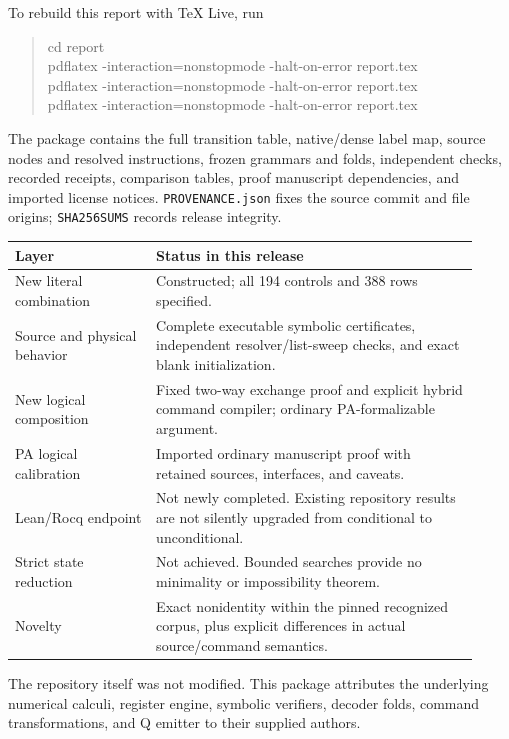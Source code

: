 \documentclass[11pt,letterpaper]{article}
\newcommand{\file}[1]{\texttt{\nolinkurl{#1}}}
\begin{document}
To rebuild this report with TeX Live, run
\begin{quote}\ttfamily
cd report\\
pdflatex -interaction=nonstopmode -halt-on-error report.tex\\
pdflatex -interaction=nonstopmode -halt-on-error report.tex\\
pdflatex -interaction=nonstopmode -halt-on-error report.tex
\end{quote}
The package contains the full transition table, native/dense label map,
source nodes and resolved instructions, frozen grammars and folds,
independent checks, recorded receipts, comparison tables, proof manuscript
dependencies, and imported license notices. \file{PROVENANCE.json} fixes the
source commit and file origins; \file{SHA256SUMS} records release integrity.

\begin{center}\small
\begin{tabular}{@{}p{0.28\linewidth}p{0.64\linewidth}@{}}
\toprule
Layer & Status in this release \\
\midrule
New literal combination & Constructed; all 194 controls and 388 rows specified. \\
Source and physical behavior & Complete executable symbolic certificates,
independent resolver/list-sweep checks, and exact blank initialization. \\
New logical composition & Fixed two-way exchange proof and explicit hybrid
command compiler; ordinary PA-formalizable argument. \\
PA logical calibration & Imported ordinary manuscript proof with retained
sources, interfaces, and caveats. \\
Lean/Rocq endpoint & Not newly completed. Existing repository results are
not silently upgraded from conditional to unconditional. \\
Strict state reduction & Not achieved. Bounded searches provide no
minimality or impossibility theorem. \\
Novelty & Exact nonidentity within the pinned recognized corpus, plus
explicit differences in actual source/command semantics. \\
\bottomrule
\end{tabular}
\end{center}
The repository itself was not modified. This package attributes the
underlying numerical calculi, register engine, symbolic verifiers, decoder
folds, command transformations, and Q emitter to their supplied authors.
\end{document}
